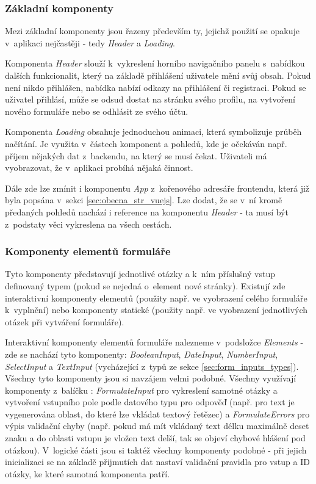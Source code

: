 		\subsubsection{Základní komponenty} \label{sec:komp_zakl} %
		Mezi základní komponenty jsou řazeny především ty, jejichž použití se opakuje v~aplikaci nejčastěji - tedy \textit{Header} a \textit{Loading}. 
		
		Komponenta \textit{Header} slouží k~vykreslení horního navigačního panelu s~nabídkou dalších funkcionalit, který na základě přihlášení uživatele mění svůj obsah. Pokud není nikdo přihlášen, nabídka nabízí odkazy na přihlášení či registraci. Pokud se uživatel přihlásí, může se odsud dostat na stránku svého profilu, na vytvoření nového formuláře nebo se odhlásit ze svého účtu.
		
		Komponenta \textit{Loading} obsahuje jednoduchou animaci, která symbolizuje průběh načítání. Je využita v~částech komponent a pohledů, kde je očekáván např. příjem nějakých dat z~backendu, na který se musí čekat. Uživateli má vyobrazovat, že v~aplikaci probíhá nějaká činnost.
		
		Dále zde lze zmínit i komponentu \textit{App} z~kořenového adresáře frontendu, která již byla popsána v~sekci \ref{sec:obecna_str_vuejs}. Lze dodat, že se v~ní kromě předaných pohledů nachází i reference na komponentu \textit{Header} - ta musí být z~podstaty věci vykreslena na všech cestách.
		
		\subsubsection{Komponenty elementů formuláře} \label{sec:komp_form} %
		Tyto komponenty představují jednotlivé otázky a k~ním příslušný vstup definovaný typem (pokud se nejedná o~element nové stránky). Existují zde interaktivní komponenty elementů (použity např. ve vyobrazení celého formuláře k~vyplnění) nebo komponenty statické (použity např. ve vyobrazení jednotlivých otázek při vytváření formuláře).
		
		Interaktivní komponenty elementů formuláře nalezneme v~podsložce \textit{Elements} - zde se nachází tyto komponenty: \textit{BooleanInput}, \textit{DateInput}, \textit{NumberInput}, \textit{SelectInput} a \textit{TextInput} (vycházející z~typů ze sekce \ref{sec:form_inputs_types}). Všechny tyto komponenty jsou si navzájem velmi podobné. Všechny využívají komponenty z~balíčku : \textit{FormulateInput} pro vykreslení samotné otázky a vytvoření vstupního pole podle datového typu pro odpověď (např. pro text je vygenerována oblast, do které lze vkládat textový řetězec) a \textit{FormulateErrors} pro výpis validační chyby (např. pokud má mít vkládaný text délku maximálně deset znaku a do oblasti vstupu je vložen text delší, tak se objeví chybové hlášení pod otázkou). V~logické části jsou si taktéž všechny komponenty podobné - při jejich inicializaci se na základě přijmutích dat nastaví validační pravidla pro vstup a ID otázky, ke které samotná komponenta patří.
		
